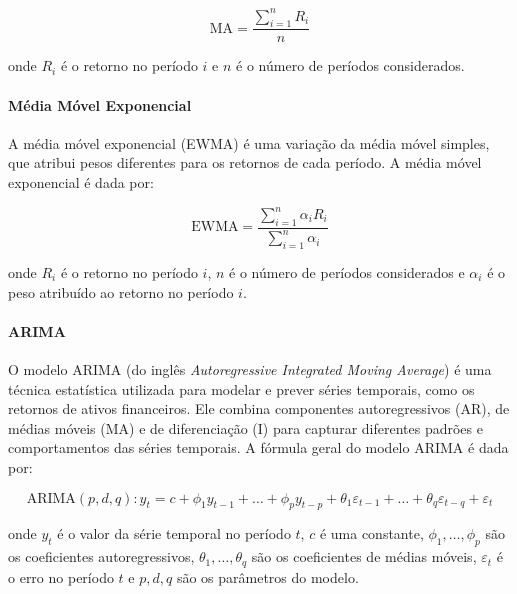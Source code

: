                 \begin{equation}
                    \text{MA} = \frac{{\sum_{i=1}^{n} R_i}}{{n}}
                \end{equation}
                
                onde $R_i$ é o retorno no período $i$ e $n$ é o número de períodos considerados.

            \paragraph{Média Móvel Exponencial}

                \ipar A média móvel exponencial (\acrshort{EWMA}) é uma variação da média móvel simples, que atribui pesos diferentes para os retornos de cada período. A média móvel exponencial é dada por:

                \begin{equation}
                    \text{EWMA} = \frac{{\sum_{i=1}^{n} \alpha_i R_i}}{{\sum_{i=1}^{n} \alpha_i}}
                \end{equation}

                \noindent onde $R_i$ é o retorno no período $i$, $n$ é o número de períodos considerados e $\alpha_i$ é o peso atribuído ao retorno no período $i$.

            \paragraph{\acrshort{ARIMA}}

                \ipar O modelo ARIMA (do inglês \textit{Autoregressive Integrated Moving Average}) é uma técnica estatística utilizada para modelar e prever séries temporais, como os retornos de ativos financeiros. Ele combina componentes autoregressivos (AR), de médias móveis (MA) e de diferenciação (I) para capturar diferentes padrões e comportamentos das séries temporais. A fórmula geral do modelo ARIMA é dada por:

                \begin{equation}
                    \text{ARIMA}(p, d, q) : y_t = c + \phi_1 y_{t-1} + \ldots + \phi_p y_{t-p} + \theta_1 \varepsilon_{t-1} + \ldots + \theta_q \varepsilon_{t-q} + \varepsilon_t
                \end{equation}

                \noindent onde $y_t$ é o valor da série temporal no período $t$, $c$ é uma constante, $\phi_1, \ldots, \phi_p$ são os coeficientes autoregressivos, $\theta_1, \ldots, \theta_q$ são os coeficientes de médias móveis, $\varepsilon_t$ é o erro no período $t$ e $p, d, q$ são os parâmetros do modelo.

